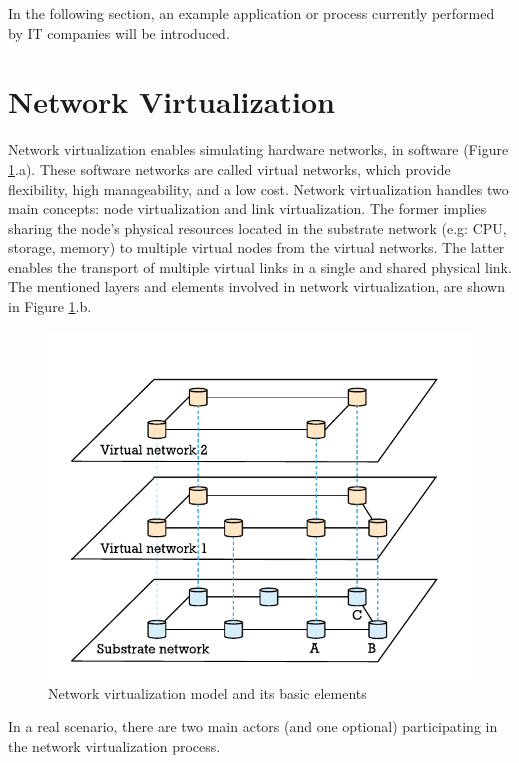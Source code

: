 In the following section, an example application or process currently performed by IT companies will be introduced.


\section{Network Virtualization}

Network virtualization enables simulating hardware networks, in software (Figure \ref{fig:networkvir}.a). These software networks are called virtual networks, which provide flexibility, high manageability, and a low cost. Network virtualization handles two main concepts: node virtualization and link virtualization. The former implies sharing the node's physical resources located in the substrate network (e.g: CPU, storage, memory) to multiple virtual nodes from the virtual networks. The latter enables the transport of multiple virtual links in a single and shared physical link. The mentioned layers and elements involved in network virtualization, are shown in Figure \ref{fig:networkvir}.b.


\begin{figure}[bth]
  \includegraphics[width=1\linewidth]{gfx/networkvir}    
  \caption{Network virtualization model and its basic elements \citep{carapinha2009network}}
  \label{fig:networkvir}
\end{figure}

In a real scenario, there are two main actors (and one optional) participating in the network virtualization process.

